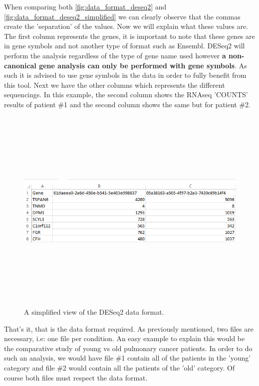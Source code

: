 \documentclass[11pt]{article}
\begin{document}
When comparing both \autoref{fig:data_format_deseq2} and \autoref{fig:data_format_deseq2_simplified} we can clearly observe that the commas create the 'separation' of the values. Now we will explain what these values are. 
The first column represents the genes, it is important to note that these genes are in gene symbols and not another type of format such as Ensembl. DESeq2 will perform the analysis regardless of the type of gene name used however \textbf{a non-canonical gene analysis can only be performed with gene symbols}. As such it is advised to use gene symbols in the data in order to fully benefit from this tool. Next we have the other columns which represents the different sequencings. In this example, the second column shows the RNAseq 'COUNTS' results of patient \#1 and the second column shows the same but for patient \#2.
\begin{figure}[h!]
\centering
\includegraphics[width=15cm,height=10cm,keepaspectratio]{dese2_excel_data_format.png}
\caption{A simplified view of the DESeq2 data format.}
\label{fig:data_format_deseq2_simplified}
\end{figure}

That's it, that is the data format required. As previously mentioned, two files are necessary, i.e: one file per condition. An easy example to explain this would be the comparative study of young vs old pulmonary cancer patients. In order to do such an analysis, we would have file \#1 contain all of the patients in the 'young' category and file \#2 would contain all the patients of the 'old' category. Of course both files must respect the data format.
\end{document}
